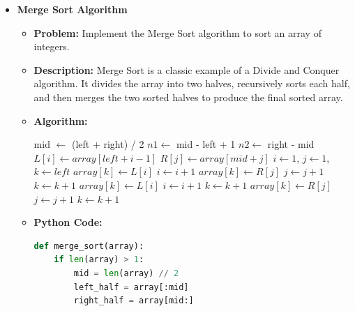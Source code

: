 \documentclass[12pt]{book} %
\begin{document}
\begin{itemize}
    \item \textbf{Merge Sort Algorithm}
    \begin{itemize}
        \item \textbf{Problem:} Implement the Merge Sort algorithm to sort an array of integers.
        \item \textbf{Description:} Merge Sort is a classic example of a Divide and Conquer algorithm. It divides the array into two halves, recursively sorts each half, and then merges the two sorted halves to produce the final sorted array.
        \item \textbf{Algorithm:}
            \begin{algorithm}[H]
            \caption{Merge Sort}
            \begin{algorithmic}[1]
                    \State mid $\gets$ (left + right) / 2
                    \State {}
                    \State {}
                    \State {}
                \EndIf
            \EndProcedure
                \State $n1 \gets$ mid - left + 1
                \State $n2 \gets$ right - mid
                \State {}
                    \State $L[i] \gets array[left + i - 1]$
                \EndFor
                    \State $R[j] \gets array[mid + j]$
                \EndFor
                \State $i \gets 1$, $j \gets 1$, $k \gets left$
                        \State $array[k] \gets L[i]$
                        \State $i \gets i + 1$
                    \Else
                        \State $array[k] \gets R[j]$
                        \State $j \gets j + 1$
                    \EndIf
                    \State $k \gets k + 1$
                \EndWhile
                    \State $array[k] \gets L[i]$
                    \State $i \gets i + 1$
                    \State $k \gets k + 1$
                \EndWhile
                    \State $array[k] \gets R[j]$
                    \State $j \gets j + 1$
                    \State $k \gets k + 1$
                \EndWhile
            \EndProcedure
            \end{algorithmic}
            \end{algorithm}
        \item \textbf{Python Code:}
        \begin{lstlisting}[language=Python]
def merge_sort(array):
    if len(array) > 1:
        mid = len(array) // 2
        left_half = array[:mid]
        right_half = array[mid:]


\end{lstlisting}
\end{itemize}
\end{itemize}
\end{document}
